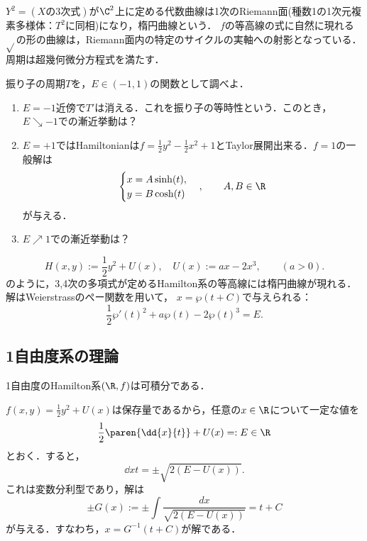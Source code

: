 \documentclass[uplatex,dvipdfmx]{jsreport}
\begin{document}
\begin{remarks}[楕円曲線と超幾何微分方程式]
    $Y^2=(X\text{の3次式})$が$\C^2$上に定める代数曲線は1次のRiemann面(種数1の1次元複素多様体：$T^2$に同相)になり，楕円曲線という．
    $f$の等高線の式に自然に現れる$\sqrt{}$の形の曲線は，Riemann面内の特定のサイクルの実軸への射影となっている．
    周期は超幾何微分方程式を満たす．
\end{remarks}

\begin{problem}
    振り子の周期$T$を，$E\in(-1,1)$の関数として調べよ．
    \begin{enumerate}
        \item $E=-1$近傍で$T'$は消える．これを振り子の等時性という．このとき，$E\searrow-1$での漸近挙動は？
        \item $E=+1$ではHamiltonianは$f=\frac{1}{2}y^2-\frac{1}{2}x^2+1$とTaylor展開出来る．$f=1$の一般解は
        \[\begin{cases}
            x=A\sinh(t),\\
            y=B\cosh(t)
        \end{cases},\qquad A,B\in\R\]
        が与える．
        \item $E\nearrow1$での漸近挙動は？
    \end{enumerate}
\end{problem}

\begin{example}
    \[H(x,y):=\frac{1}{2}y^2+U(x),\quad U(x):=ax-2x^3,\qquad(a>0).\]
    のように，3,4次の多項式が定めるHamilton系の等高線には楕円曲線が現れる．解はWeierstrassのぺー関数を用いて，
    $x=\wp(t+C)$で与えられる：
    \[\frac{1}{2}\wp'(t)^2+a\wp(t)-2\wp(t)^3=E.\]
\end{example}

\subsection{1自由度系の理論}

\begin{proposition}[1自由度のHamilton系の可積分性]
    1自由度のHamilton系$(\R,f)$は可積分である．
\end{proposition}
\begin{Proof}
    $f(x,y)=\frac{1}{2}y^2+U(x)$は保存量であるから，任意の$x\in\R$について一定な値を
    \[\frac{1}{2}\paren{\dd{x}{t}}+U(x)=:E\in\R\]
    とおく．すると，
    \[\dd{x}{t}=\pm\sqrt{2(E-U(x))}.\]
    これは変数分利型であり，解は
    \[\pm G(x):=\pm\int\frac{dx}{\sqrt{2(E-U(x))}}=t+C\]
    が与える．すなわち，$x=G^{-1}(t+C)$が解である．
\end{Proof}
\end{document}
